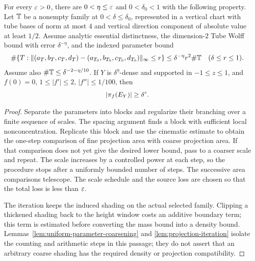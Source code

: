 \begin{theorem}
\label{thm:twisted-parameter}
\leanok
{}
For every $\varepsilon>0$, there are $0<\eta\leq\varepsilon$ and
$0<\delta_0<1$ with the following property. Let $\mathbb{T}$ be a nonempty
family at $0<\delta\leq\delta_0$, represented in a vertical chart
with tube bases of norm at most $4$ and vertical direction component
of absolute value at least $1/2$. Assume analytic essential
distinctness, the dimension-$2$ Tube Wolff bound with error
$\delta^{-\eta}$, and the indexed parameter bound
\[
 \#\{T:\|(a_T,b_T,c_T,d_T)-(a_{T_0},b_{T_0},c_{T_0},d_{T_0})\|_\infty
                  \leq r\}
       \leq\delta^{-\eta}r^2\#\mathbb{T}
       \quad(\delta\leq r\leq1).
\]
Assume also $\#\mathbb{T}\leq\delta^{-2-\eta/10}$.
If $Y$ is $\delta^\eta$-dense and supported in $-1\leq z\leq1$,
and $f(0)=0$, $1\leq|f'|\leq2$, $|f''|\leq1/100$, then
\[
                         |\pi_f(E_Y)|\geq\delta^\varepsilon.
\]
\end{theorem}
\begin{proof}
\leanok
Separate the parameters into blocks and regularize their branching
over a finite sequence of scales. The spacing argument finds a
block with sufficient local nonconcentration. Replicate this block
and use the cinematic estimate to obtain the one-step comparison of
fine projection area with coarse projection area. If that comparison
does not yet give the desired lower bound, pass to a coarser scale
and repeat. The scale increases by a controlled power at each step,
so the procedure stops after a uniformly bounded number of steps.
The successive area comparisons telescope. The scale schedule and
the source loss are chosen so that the total loss is less than
$\varepsilon$.

The iteration keeps the induced shading on the actual selected
family. Clipping a thickened shading back to the height window costs
an additive boundary term; this term is estimated before converting
the mass bound into a density bound.
Lemmas~\ref{lem:uniform-parameter-coarsening} and
\ref{lem:projection-iteration} isolate the counting and arithmetic
steps in this passage; they do not assert that an arbitrary coarse
shading has the required density or projection compatibility.
\end{proof}


